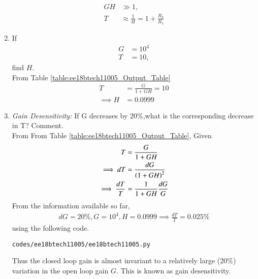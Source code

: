 \begin{enumerate}[label=\thesubsection.\arabic*.,ref=\thesubsection.\theenumi]
\begin{align}
 GH &\gg 1,
 \\
T &\approx \frac{1}{H}  = 1 + \frac{R_2}{R_1} 
\label{eq:ee18btech11005_T}
\end{align}
\item If 
\begin{align} 
G & = 10^4
\\
T &= 10,
\end{align}
find $H$.
\\
\solution From Table \ref{table:ee18btech11005_Output_Table}
\begin{align}
    T &=  \frac{G}{1+GH} = 10
\\
\implies  H &= 0.0999
\end{align}
\item {\em Gain Desensitivity:} If G decreases by 20\%,what is the corresponding decrease in T?  Comment.
\\
\solution From From Table \ref{table:ee18btech11005_Output_Table},
Given
\begin{align}
T &= \frac{G}{1+GH}
\\
\implies dT &= \frac{dG}{\left(1+GH\right)^2}
\\
\implies \frac{dT}{T} &= \frac{1}{1+GH}\frac{dG}{G}
\end{align}
From the information available so far, 
\begin{align}
dG = 20\%, G = 10^4, H = 0.0999
\implies \frac{dT}{T} = 0.025\%
\end{align}
%
using the following code.
\begin{lstlisting}
codes/ee18btech11005/ee18btech11005.py
\end{lstlisting}
%
Thus the closed loop gain is almost invariant to a relatively large (20\%) variation in the open loop gain $G$.  This is known as gain desensitivity.
\end{enumerate}
